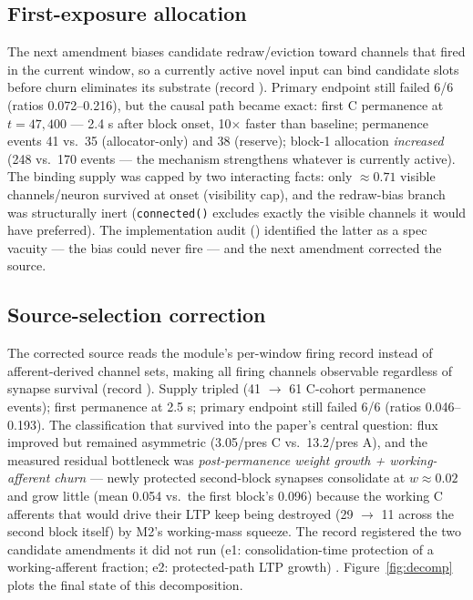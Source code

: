 \subsection{First-exposure allocation}

The next amendment biases candidate redraw/eviction toward channels
that fired in the current window, so a currently active novel input can
bind candidate slots before churn eliminates its substrate (record
\cite{fe}). Primary endpoint still failed 6/6 (ratios 0.072--0.216),
but the causal path became exact: first C permanence at \(t = 47{,}400\)
--- 2.4 s after block onset, 10\(\times\) faster than baseline;
permanence events 41 vs.\ 35 (allocator-only) and 38 (reserve);
block-1 allocation \emph{increased} (248 vs.\ 170 events --- the
mechanism strengthens whatever is currently active). The binding supply
was capped by two interacting facts: only \(\approx 0.71\) visible
channels/neuron survived at onset (visibility cap), and the
redraw-bias branch was structurally inert (\texttt{connected()}
excludes exactly the visible channels it would have preferred). The
implementation audit (\cite{feimpl}) identified the latter as a spec
vacuity --- the bias could never fire --- and the next amendment
corrected the source.

\subsection{Source-selection correction}

The corrected source reads the module's per-window firing record
instead of afferent-derived channel sets, making all firing channels
observable regardless of synapse survival (record \cite{fec}). Supply
tripled (41 \(\to\) 61 C-cohort permanence events); first permanence at
2.5 s; primary endpoint still failed 6/6 (ratios 0.046--0.193).
The classification that survived into the paper's central question:
flux improved but remained asymmetric (3.05/pres C vs.\ 13.2/pres A),
and the measured residual bottleneck was \emph{post-permanence weight
growth + working-afferent churn} --- newly protected second-block
synapses consolidate at \(w\approx 0.02\) and grow little (mean 0.054
vs.\ the first block's 0.096) because the working C afferents that
would drive their LTP keep being destroyed (29 \(\to\) 11 across the
second block itself) by M2's working-mass squeeze. The record
registered the two candidate amendments it did not run (e1:
consolidation-time protection of a working-afferent fraction; e2:
protected-path LTP growth) \cite{fec}. Figure~\ref{fig:decomp} plots
the final state of this decomposition.

